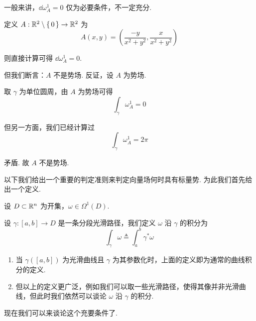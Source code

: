 \begin{hint}
    一般来讲，$\dd\omega_A^1=0$ 仅为必要条件，不一定充分.
\end{hint}

\begin{example}
    定义 $A:\mathbb{R}^2\setminus\set{0}\to\mathbb{R}^2$ 为
$$
A(x,y)=\left(\frac{-y}{x^2+y^2},\frac{x}{x^2+y^2}\right)
$$
    
    则直接计算可得 $\dd\omega_A^1=0$.

    但我们断言：$A$ 不是势场. 反证，设 $A$ 为势场.

    取 $\gamma$ 为单位圆周，由 $A$ 为势场可得
$$
\int_\gamma\omega_A^1=0
$$

    但另一方面，我们已经计算过
$$
\int_\gamma\omega_A^1=2\pi
$$

    矛盾. 故 $A$ 不是势场.
\end{example}


以下我们给出一个重要的判定准则来判定向量场何时具有标量势. 为此我们首先给出一个定义.

\begin{definition}
    设 $D\subset\mathbb{R}^n$ 为开集，$\omega\in\Omega^1(D)$.

    设 $\gamma:[a,b]\to D$ 是一条分段光滑路径，我们定义 $\omega$ 沿 $\gamma$ 的积分为
$$
\int_\gamma\omega\triangleq\int_a^b\gamma^*\omega
$$
\end{definition}

\begin{hint}
    \begin{enumerate}
        \item 当 $\gamma([a,b])$ 为光滑曲线且 $\gamma$ 为其参数化时，上面的定义即为通常的曲线积分的定义.
        
        \item 但以上的定义更广泛，例如我们可以取一些光滑路径，使得其像并非光滑曲线，但此时我们依然可以谈论 $\omega$ 沿 $\gamma$ 的积分.
    \end{enumerate}
\end{hint}


现在我们可以来谈论这个充要条件了.

